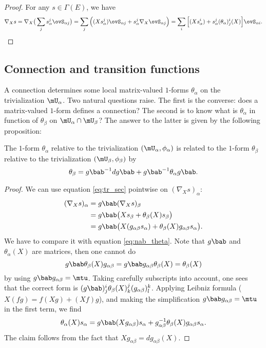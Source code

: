 \begin{proof}
	For any $s\in\Gamma(E)$, we have
	\begin{equation}
		\nabla_Xs=\nabla_X\big(  \sum_j s^j_{\alpha}\ovS_{\alpha j}  \big)
		=\sum_j\Big(  (Xs_{\alpha}^j)\ovS_{\alpha j} + s^j_{\alpha}\nabla_X\ovS_{\alpha j}     \Big)
		=\sum_i\Big[   (Xs_{\alpha}^i)+s_{\alpha}^j(\theta_{\alpha})_j^i(X)  \Big]\ovS_{\alpha i}.
	\end{equation}
\end{proof}

\subsection{Connection and transition functions}

A connection determines some local matrix-valued $1$-forms $\theta_{\alpha}$ on the trivialization $\mU_{\alpha}$. Two natural questions raise. The first is the converse: does a matrix-valued $1$-form defines a connection? The second is to know  what is $\theta_{\alpha}$ in function of $\theta_{\beta}$ on $\mU_{\alpha}\cap\mU_{\beta}$? The answer to the latter is  given by the following proposition:

\begin{proposition}
	The $1$-form $\theta_{\alpha}$ relative to the trivialization $(\mU_{\alpha},\phi_{\alpha})$ is related to the $1$-form $\theta_{\beta}$ relative to the trivialization $(\mU_{\beta},\phi_{\beta})$ by
	\begin{equation}\label{eq:theta_g}
		\theta_{\beta}=g\bab^{-1} dg\bab+g\bab^{-1}\theta_{\alpha} g\bab.
	\end{equation}
\end{proposition}

\begin{proof}
	We can use equation \eqref{eq:tr_sec} pointwise on $(\nabla_X s)_{\alpha}$:
	\begin{equation}
		\begin{split}
			(\nabla_X s)_{\alpha}&=g\bab(\nabla_Xs)_{\beta}\\
			&=g\bab\big(   Xs_{\beta}+\theta_{\beta}(X)s_{\beta}   \big) \\
			&=g\bab\big(   X(g_{\alpha\beta} s_{\alpha})+\theta_{\beta}(X)g_{\alpha\beta} s_{\alpha}   \big).
		\end{split}
	\end{equation}
	We have to compare it with equation \eqref{eq:nab_theta}. Note that $g\bab$ and $\theta_{\alpha}(X)$ are matrices, then one cannot do
	\[
		g\bab\theta_{\beta}(X)g_{\alpha\beta} =g\bab g_{\alpha\beta}\theta_{\beta}(X)=\theta_{\beta}(X)
	\]
	by using $g\bab g_{\alpha\beta}=\mtu$.  Taking carefully subscripts into account, one sees that the correct form is $(g\bab)^i_j\theta_{\beta}(X)^j_k(g_{\alpha\beta})^k_l$. Applying Leibniz formula ($X(fg)=f(Xg)+(Xf)g$), and making the simplification $g\bab g_{\alpha\beta}=\mtu$ in the first term, we find
	\[
		\theta_{\alpha}(X)s_{\alpha}=g\bab(Xg_{\alpha\beta})s_{\alpha}+g_{\alpha\beta}^{-1}\theta_{\beta}(X)g_{\alpha\beta} s_{\alpha}.
	\]
	The claim follows from the fact that $Xg_{\alpha\beta}=dg_{\alpha\beta}(X)$.
\end{proof}



